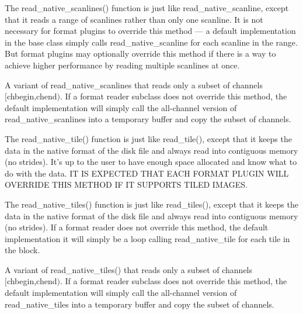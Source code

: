 The {\kw read_native_scanlines()} function is just like 
{\cf read_native_scanline}, except that it reads
a range of scanlines rather than only one scanline.  It is not necessary
for format plugins to override this method --- a default implementation
in the \ImageInput base class simply calls {\cf read_native_scanline}
for each scanline in the range.  But format plugins may optionally
override this method if there is a way to achieve higher performance by
reading multiple scanlines at once.
\apiend

A variant of {\cf read_native_scanlines} that reads only a subset of 
channels \\ $[${\cf chbegin},{\cf chend}$)$.  
If a format reader subclass does
not override this method, the default implementation will simply
call the all-channel version of {\cf read_native_scanlines} into a
temporary buffer and copy the subset of channels.
\apiend

The {\kw read_native_tile()} function is just like {\kw read_tile()}, 
except that it keeps the data in the native format of the disk file and
always read into contiguous memory (no strides).  It's up to the user to
have enough space allocated and know what to do with the data.  IT IS
EXPECTED THAT EACH FORMAT PLUGIN WILL OVERRIDE THIS METHOD IF IT
SUPPORTS TILED IMAGES.
\apiend

The {\kw read_native_tiles()} function is just like {\kw read_tiles()}, 
except that it keeps the data in the native format of the disk file and
always read into contiguous memory (no strides).  
If a format reader does not override this method, the default
implementation it will simply be a loop calling read_native_tile
for each tile in the block.
\apiend

A variant of {\kw read_native_tiles()} that reads only a subset of 
channels \\ $[${\cf chbegin},{\cf chend}$)$.  
If a format reader subclass does
not override this method, the default implementation will simply
call the all-channel version of {\cf read_native_tiles} into a
temporary buffer and copy the subset of channels.
\apiend


